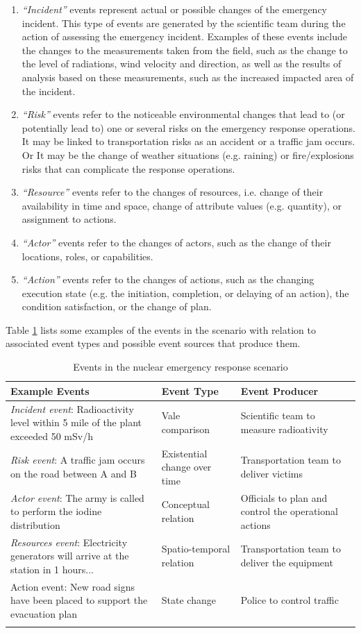 \begin{enumerate}
 	\item \emph{``Incident''} events represent actual or possible changes of the emergency incident. This type of events are generated by the scientific team during the action of assessing the emergency incident. Examples of these events include the changes to the measurements taken from the field, such as the change to the level of radiations, wind velocity and direction, as well as the results of analysis based on these measurements, such as the increased impacted area of the incident. 
 	\item \emph{``Risk''} events refer to the noticeable environmental changes that lead to (or potentially lead to) one or several risks on the emergency response operations. It may be linked to transportation risks as an accident or a traffic jam occurs. Or It may be the change of weather situations (e.g. raining) or fire/explosions risks that can complicate the response operations. 
 	\item \emph{``Resource''} events refer to the changes of resources, i.e. change of their availability in time and space, change of attribute values (e.g. quantity), or assignment to actions.
 	\item \emph{``Actor''} events refer to the changes of actors, such as the change of their locations, roles, or capabilities.
 	\item \emph{``Action''} events refer to the changes of actions, such as the changing execution state (e.g. the initiation, completion, or delaying of an action), the condition satisfaction, or the change of plan. 
 \end{enumerate} 

Table \ref{tab:events_in_scenario} lists some examples of the events in the scenario with relation to associated event types and possible event sources that produce them.

{\footnotesize
\begin{longtable}{>{\raggedright}p{1.8in}>{\raggedright}p{1.8in}>{\raggedright}p{1.8in}}
\toprule 
\textbf{Example Events} & \textbf{Event Type} & \textbf{Event Producer}\tabularnewline
\midrule 
\emph{Incident event}: Radioactivity level within 5 mile of the plant
exceeded 50 mSv/h & Vale comparison & Scientific team to measure radioativity\tabularnewline
\midrule 
\emph{Risk event}: A traffic jam occurs on the road between A and
B  & Existential change over time & Transportation team to deliver victims\tabularnewline
\midrule 
\emph{Actor event}: The army is called to perform the iodine distribution & Conceptual relation & Officials to plan and control the operational actions\tabularnewline
\midrule 
\emph{Resources event}: Electricity generators will arrive at the station in 1 hours... & Spatio-temporal relation & Transportation team to deliver the equipment\tabularnewline
\midrule 
Action event: New road signs have been placed to support the evacuation
plan & State change & Police to control traffic\tabularnewline
\bottomrule
\caption{Events in the nuclear emergency response scenario}
\label{tab:events_in_scenario}
\end{longtable}
}

